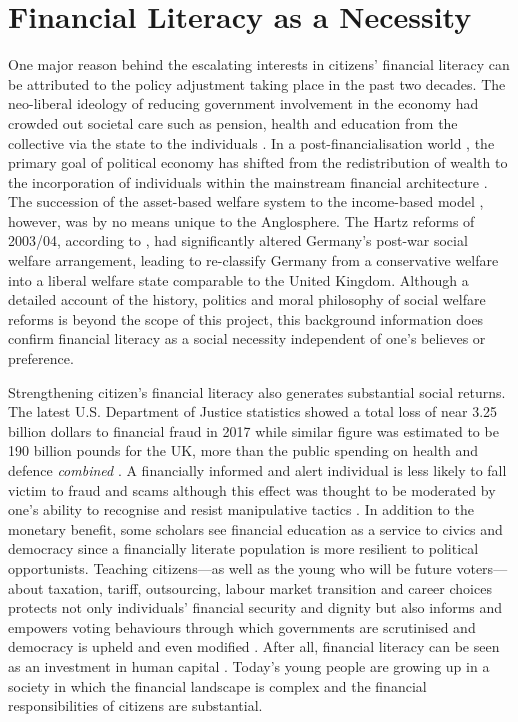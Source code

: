 \documentclass[a4paper,11pt,UKenglish,twoside,openright]{report}\usepackage[]{graphicx}\usepackage[]{color}
\begin{document}
\section{Financial Literacy as a Necessity}

One major reason behind the escalating interests in citizens' financial literacy can be attributed to the policy adjustment taking place in the past two decades. The neo-liberal ideology of reducing government involvement in the economy had crowded out societal care such as pension, health and education from the collective via the state to the individuals \parencite{gilbert:2002}. In a post-financialisation world \parencite{krippner:2005}, the primary goal of political economy has shifted from the redistribution of wealth to the incorporation of individuals within the mainstream financial architecture \parencite{regan:2003}. The succession of the asset-based welfare system to the income-based model \parencite{finlayson:2009}, however, was by no means unique to the Anglosphere. The Hartz reforms of 2003/04, according to \textcite{seeleibkaiser:2016}, had significantly altered Germany's post-war social welfare arrangement, leading \textcite{ferragina:2015} to re-classify Germany from a conservative welfare into a liberal welfare state comparable to the United Kingdom. Although a detailed account of the history, politics and moral philosophy of social welfare reforms is beyond the scope of this project, this background information does confirm financial literacy as a social necessity independent of one's believes or preference.

Strengthening citizen's financial literacy also generates substantial social returns. The latest U.S. Department of Justice statistics showed a total loss of near 3.25 billion dollars to financial fraud in 2017 \parencite{doj:2021} while similar figure was estimated to be 190 billion pounds for the UK, more than the public spending on health and defence \emph{combined} \parencite{afi:2018}. A financially informed and alert individual is less likely to fall victim to fraud and scams \parencite{gamble:2015, lusardi:2012b} although this effect was thought to be moderated by one's ability to recognise and resist manipulative tactics \parencite{drew:2016}. In addition to the monetary benefit, some scholars see financial education as a service to civics and democracy since a financially literate population is more resilient to political opportunists. Teaching citizens---as well as the young who will be future voters---about taxation, tariff, outsourcing, labour market transition and career choices protects not only individuals' financial security and dignity but also informs and empowers voting behaviours through which governments are scrutinised and democracy is upheld \parencite{davies:2015} and even modified \parencite{arthur:2016}. After all, financial literacy can be seen as an investment in human capital \parencite{lusardi:2014}. Today's young people are growing up in a society in which the financial landscape is complex and the financial responsibilities of citizens are substantial.
\end{document}
